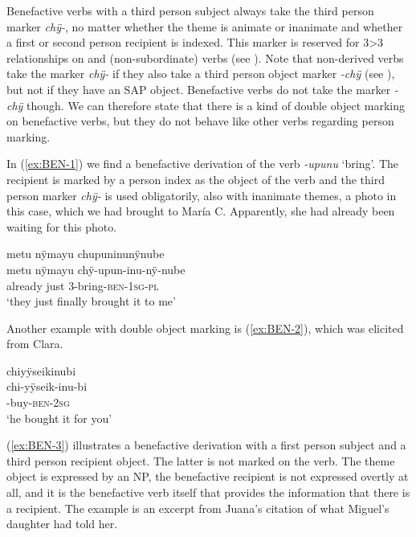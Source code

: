 Benefactive verbs with a third person subject always take the third person marker \textit{chÿ-}, no matter whether the theme is animate or inanimate and whether a first or second person recipient is indexed. This marker is reserved for 3>3 relationships on  and  (non-subordinate) verbs (see ). Note that non-derived  verbs take the marker \textit{chÿ-} if they also take a third person object  marker \textit{-chÿ} (see ), but not if they have an SAP object. Benefactive verbs do not take the marker \textit{-chÿ} though. We can therefore state that there is a kind of double object marking on benefactive verbs, but they do not behave like other  verbs regarding person marking.

In (\ref{ex:BEN-1}) we find a benefactive derivation of the verb \textit{-upunu} ‘bring’. The recipient is marked by a person index as the object of the verb and the third person marker \textit{chÿ-} is used obligatorily, also with inanimate themes, a photo in this case, which we had brought to María C. Apparently, she had already been waiting for this photo. 

\ea\label{ex:BEN-1}
\begingl
\glpreamble metu nÿmayu chupuninunÿnube\\
\gla metu nÿmayu chÿ-upun-inu-nÿ-nube\\
\glb already just 3-bring-\textsc{ben}-1\textsc{sg}-\textsc{pl}\\
\glft ‘they just finally brought it to me’
\endgl
\trailingcitation{[cux-c120410ls.134]}%
\xe

Another example with double object marking is (\ref{ex:BEN-2}), which was elicited from Clara.

\ea\label{ex:BEN-2}
\begingl
\glpreamble chiyÿseikinubi\\
\gla chi-yÿseik-inu-bi\\
-buy-\textsc{ben}-2\textsc{sg}\\
\glft ‘he bought it for you’
\endgl
\trailingcitation{[cxx-e120410ls-2.006]}%
\xe
{}

 (\ref{ex:BEN-3}) illustrates a benefactive derivation with a first person subject and a third person recipient object. The latter is not marked on the verb. The theme object is expressed by an NP, the benefactive recipient is not expressed overtly at all, and it is the benefactive verb itself that provides the information that there is a recipient. The example is an excerpt from Juana’s citation of what Miguel’s daughter had told her.

